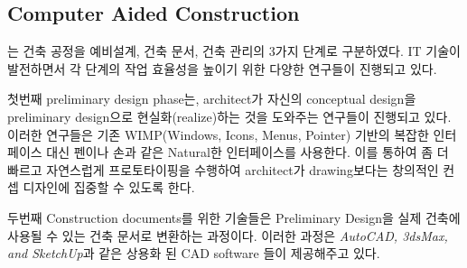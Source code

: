 


\subsection{Computer Aided Construction}

\cite{harrison_architects_design_????}는 건축 공정을 예비설계, 건축 문서, 건축 관리의 3가지 단계로 구분하였다. IT 기술이 발전하면서 각 단계의 작업 효율성을 높이기 위한 다양한 연구들이 진행되고 있다.

첫번째 preliminary design phase는, architect가 자신의 conceptual design을 preliminary design으로 현실화(realize)하는 것을 도와주는 연구들이 진행되고 있다\cite{bae_ilovesketch:_2008, igarashi_teddy:_2007, song_modelcraft_2009, yu_prototype_2007, zeleznik_sketch:_2007}. 이러한 연구들은 기존 WIMP(Windows, Icons, Menus, Pointer)\cite{wikipedia_contributors_wimp_2014} 기반의 복잡한 인터페이스 대신 펜이나 손과 같은 Natural한 인터페이스를 사용한다. 이를 통하여 좀 더 빠르고 자연스럽게 프로토타이핑을 수행하여 architect가 drawing보다는 창의적인 컨셉 디자인에 집중할 수 있도록 한다. 

두번째 Construction documents를 위한 기술들은 Preliminary Design을 실제 건축에 사용될 수 있는 건축 문서로 변환하는 과정이다. 이러한 과정은 \textit{AutoCAD, 3dsMax, and SketchUp}과 같은 상용화 된 CAD software 들이 제공해주고 있다\cite{autodesk_3ds_????, autodesk_autocad_????, google_sketchup_????}.


